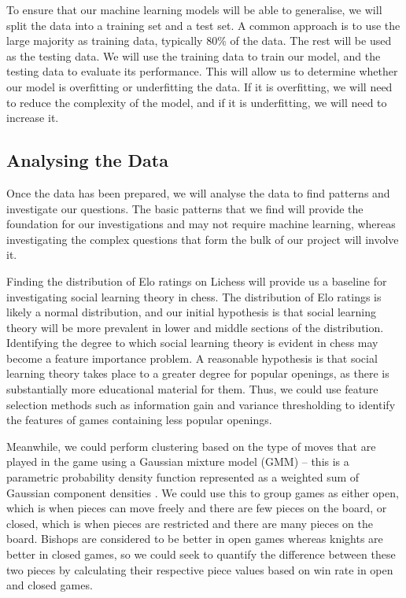 \documentclass[%
 superscriptaddress,
showpacs,preprintnumbers,
 amsmath,
 amssymb,
 aps,
 pra,
showkeys,
onecolumn,
notitlepage,
11pt,
tightenlines      %
]{revtex4-1}
\begin{document}
To ensure that our machine learning models will be able to generalise, we will split the data into a training set and a test set. A common approach is to use the large majority as training data, typically 80\% of the data. The rest will be used as the testing data. We will use the training data to train our model, and the testing data to evaluate its performance. This will allow us to determine whether our model is overfitting or underfitting the data. If it is overfitting, we will need to reduce the complexity of the model, and if it is underfitting, we will need to increase it.

\subsection{Analysing the Data}
Once the data has been prepared, we will analyse the data to find patterns and investigate our questions. The basic patterns that we find will provide the foundation for our investigations and may not require machine learning, whereas investigating the complex questions that form the bulk of our project will involve it.

Finding the distribution of Elo ratings on Lichess will provide us a baseline for investigating social learning theory in chess. The distribution of Elo ratings is likely a normal distribution, and our initial hypothesis is that social learning theory will be more prevalent in lower and middle sections of the distribution. Identifying the degree to which social learning theory is evident in chess may become a feature importance problem. A reasonable hypothesis is that social learning theory takes place to a greater degree for popular openings, as there is substantially more educational material for them. Thus, we could use feature selection methods such as information gain and variance thresholding to identify the features of games containing less popular openings.

Meanwhile, we could perform clustering based on the type of moves that are played in the game using a Gaussian mixture model (GMM) -- this is a parametric probability density function represented as a weighted sum of Gaussian component densities \cite{reynolds2009gaussian}. We could use this to group games as either open, which is when pieces can move freely and there are few pieces on the board, or closed, which is when pieces are restricted and there are many pieces on the board. Bishops are considered to be better in open games whereas knights are better in closed games, so we could seek to quantify the difference between these two pieces by calculating their respective piece values based on win rate in open and closed games.
\end{document}
